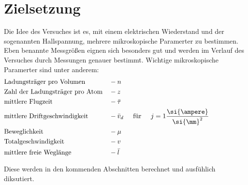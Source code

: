 \section{Zielsetzung}
Die Idee des Versuches ist es, mit einem elektrischen Wiederstand und der sogenannten Hallspannung, mehrere mikroskopische Paramerter zu bestimmen. 
Eben benannte Messgrößen eignen sich besonders gut und werden im Verlauf des Versuches durch Messungen genauer bestimmt. Wichtige mikroskopische Paramerter sind unter anderem:
\begin{align*}
\label{al:Sammlung}
&\text{Ladungsträger pro Volumen } &&- n \\
&\text{Zahl der Ladungsträger pro Atom} &&- z \\
&\text{mittlere Flugzeit} &&- \bar{\tau} \\
&\text{mittlere Driftgeschwindigkeit} &&- \bar{v}_d \hspace{0.5cm}\text{für} \hspace{0.5cm} j = 1 \frac{\si{\ampere}}{{\si{\mm}}^2} \hspace{2cm}\\
&\text{Beweglichkeit} &&-\mu \\
&\text{Totalgeschwindigkeit} &&- v \\
&\text{mittlere freie Weglänge} &&- \bar{l}
\end{align*} 

\flushleft
Diese werden in den kommenden Abschnitten berechnet und ausfühlich diksutiert.
